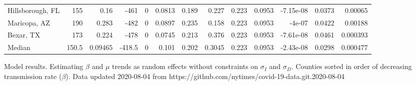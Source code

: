 \documentclass[12pt,letterpaper]{article}
\begin{document}
\begin{appendices}
\begin{sidewaystable}
{\begin{tabular}{lrrrrrrrrrrrr}
 Hillsborough, FL   & 155   & 0.16    & -461   &     0 &          0.0813 &            0.189 &         0.227  &        0.223 &       0.0953 &        -7.15e-08 &           0.0373  &        0.00065  \\
 Maricopa, AZ       & 190   & 0.283   & -482   &     0 &          0.0897 &            0.235 &         0.158  &        0.223 &       0.0953 &        -4e-07    &           0.0422  &        0.00188  \\
 Bexar, TX          & 173   & 0.224   & -478   &     0 &          0.0745 &            0.213 &         0.376  &        0.223 &       0.0953 &        -7.61e-08 &           0.0461  &        0.000393 \\
\hline
 Median             & 150.5 & 0.09465 & -418.5 &     0 &          0.101  &            0.202 &         0.3045 &        0.223 &       0.0953 &        -2.43e-08 &           0.0298  &        0.000477 \\
\hline
\end{tabular}


}\end{sidewaystable}
\clearpage


\begin{sidewaystable}
\caption{\label{tab:uncons}
Model results. Estimating $\beta$ and $\mu$ trends as random effects
without constraints on  $\sigma_I$ and $\sigma_D$. 
Counties sorted in order of decreasing transmission rate ($\beta$).
Data updated 2020-08-04 from https://github.com/nytimes/covid-19-data.git.2020-08-04
}
\centering
{\scriptsize

}
\end{sidewaystable}
\end{appendices}
\end{document}
